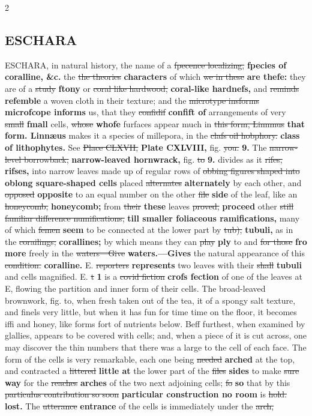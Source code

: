 \documentclass[10pt]{article}
\begin{document}
\begin{multicols}{2}
\subsection*{ESCHARA}
ESCHARA, in natural history, the name of a \sout{fpecence localizing,} \textbf{fpecies of coralline, \&c.} the \sout{the theories} \textbf{characters} of which \sout{we in these} \textbf{are thefe:} they are of a \sout{study} \textbf{ftony} or \sout{coral like hardwood,} \textbf{coral-like hardnefs,} and \sout{reminds} \textbf{refemble} a woven cloth in their texture; and the \sout{microtype insforms} \textbf{microfcope informs} us, that they \sout{confidif} \textbf{confift of} arrangements of very \sout{small} \textbf{fmall} cells, \sout{whose} \textbf{whofe} furfaces appear much in \sout{this form, Linnmus} \textbf{that form. Linnæus} makes it a species of millepora, in the \sout{clafs oil hobphory.} \textbf{class of lithophytes.} See \sout{Place CLXVII,} \textbf{Plate CXLVIII,} fig. \sout{you.} \textbf{9.} The \sout{narrow-level borrowback,} \textbf{narrow-leaved hornwrack,} fig. \sout{to} \textbf{9.} divides as it \sout{rifes,} \textbf{rifses,} into narrow leaves made up of regular rows of \sout{obbing figures shaped into} \textbf{oblong square-shaped cells} placed \sout{alternates} \textbf{alternately} by each other, and \sout{opposed} \textbf{opposite} to an equal number on the other \sout{file} \textbf{side} of the leaf, like an \sout{honeycomb,} \textbf{honeycomb;} from \sout{their} \textbf{these} leaves \sout{proved,} \textbf{proceed} other \sout{still familiar difference numifications,} \textbf{till smaller foliaceous ramifications,} many of which \sout{femen} \textbf{seem} to be connected at the lower part by \sout{tub),} \textbf{tubuli,} as in the \sout{corailings;} \textbf{corallines;} by which means they can \sout{play} \textbf{ply} to and \sout{for those} \textbf{fro more} freely in the \sout{waters—Give} \textbf{waters.—Gives} the natural appearance of this \sout{condition.} \textbf{coralline.} E. \sout{reporters} \textbf{represents} two leaves with their \sout{shall} \textbf{tubuli} and cells magnified. E. \sout{t} \textbf{1} is a \sout{covid fiction} \textbf{crofs fection} of one of the leaves at E, flowing the partition and inner form of their cells. The broad-leaved brownwork, fig. to, when fresh taken out of the tea, it of a spongy salt texture, and finels very little, but when it has fun for time time on the floor, it becomes iffi and honey, like forms fort of nutrients below. Beff furthest, when examined by glallies, appears to be covered with cells; and, when a piece of it is cut across, one may discover the thin numbers that there was a large to the cell of each face. The form of the cells is very remarkable, each one being \sout{needed} \textbf{arched} at the top, and contracted a \sout{littered} \textbf{little at} the lower part of the \sout{files} \textbf{sides} to make \sout{sure} \textbf{way} for the \sout{reaches} \textbf{arches} of the two next adjoining cells; \sout{fo} \textbf{so} that by this \sout{particulus contribution so soon} \textbf{particular construction no room} is \sout{hold.} \textbf{lost.} The \sout{utterance} \textbf{entrance} of the cells is immediately under the \sout{arch,} 
\end{multicols}
\end{document}
